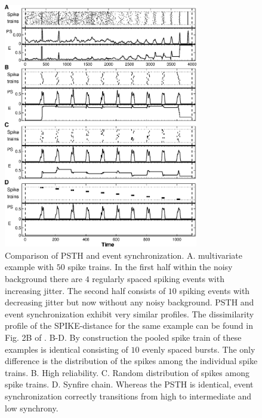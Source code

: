 \documentclass[10pt,twocolumn]{elsart5p}
\begin{document}
%
%
\begin{figure}
    \includegraphics[width=85mm]{PSTH_ES.eps}
    \caption{\abb\label{fig:PSTH-ES} Comparison of PSTH and event synchronization. A. multivariate example with $50$
spike trains. In the first half within the noisy background there are $4$ regularly spaced spiking events with increasing jitter. The second half consists of $10$ spiking events with decreasing jitter but now without any noisy background. PSTH and event synchronization exhibit very similar profiles. The dissimilarity profile of the SPIKE-distance for the same example can be found in Fig. 2B of \citet{Kreuz13}.    B-D. By construction the pooled spike train of these examples is identical consisting of $10$ evenly spaced bursts. The only difference is the distribution of the spikes among the individual spike trains. B. High reliability. C. Random distribution of spikes among spike trains. D. Synfire chain. Whereas the PSTH is identical, event synchronization correctly transitions from high to intermediate and low synchrony.}
\end{figure}
%
%
	
\end{document}
